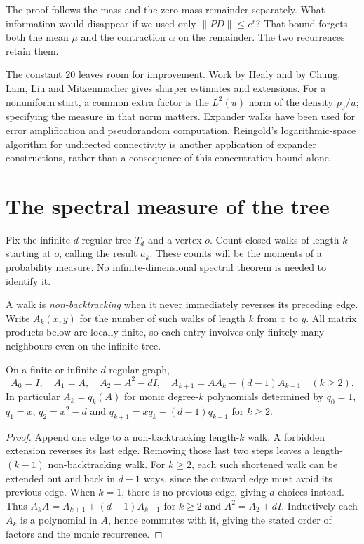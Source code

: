 \begin{think}
The proof follows the mass and the zero-mass remainder separately. What information would disappear if we used only $\|PD\|\le e^r$? That bound forgets both the mean $\mu$ and the contraction $\alpha$ on the remainder. The two recurrences retain them.
\end{think}

\begin{remark}
The constant $20$ leaves room for improvement. Work by Healy and by Chung, Lam, Liu and Mitzenmacher gives sharper estimates and extensions. For a nonuniform start, a common extra factor is the $L^2(u)$ norm of the density $p_0/u$; specifying the measure in that norm matters. Expander walks have been used for error amplification and pseudorandom computation. Reingold's logarithmic-space algorithm for undirected connectivity is another application of expander constructions, rather than a consequence of this concentration bound alone.
\end{remark}

\section{The spectral measure of the tree}

Fix the infinite $d$-regular tree $T_d$ and a vertex $o$. Count closed walks of length $k$ starting at $o$, calling the result $a_k$. These counts will be the moments of a probability measure. No infinite-dimensional spectral theorem is needed to identify it.

A walk is \emph{non-backtracking} when it never immediately reverses its preceding edge. Write $A_k(x,y)$ for the number of such walks of length $k$ from $x$ to $y$. All matrix products below are locally finite, so each entry involves only finitely many neighbours even on the infinite tree.

\begin{lemma}\label{lem:nbpoly}
On a finite or infinite $d$-regular graph,
\[
A_0=I,\quad A_1=A,\quad A_2=A^2-dI,\quad
A_{k+1}=AA_k-(d-1)A_{k-1}\quad(k\ge2).
\]
In particular $A_k=q_k(A)$ for monic degree-$k$ polynomials determined by $q_0=1$, $q_1=x$, $q_2=x^2-d$ and $q_{k+1}=xq_k-(d-1)q_{k-1}$ for $k\ge2$.
\end{lemma}
\begin{proof}
Append one edge to a non-backtracking length-$k$ walk. A forbidden extension reverses its last edge. Removing those last two steps leaves a length-$(k-1)$ non-backtracking walk. For $k\ge2$, each such shortened walk can be extended out and back in $d-1$ ways, since the outward edge must avoid its previous edge. When $k=1$, there is no previous edge, giving $d$ choices instead. Thus $A_kA=A_{k+1}+(d-1)A_{k-1}$ for $k\ge2$ and $A^2=A_2+dI$. Inductively each $A_k$ is a polynomial in $A$, hence commutes with it, giving the stated order of factors and the monic recurrence.
\end{proof}

